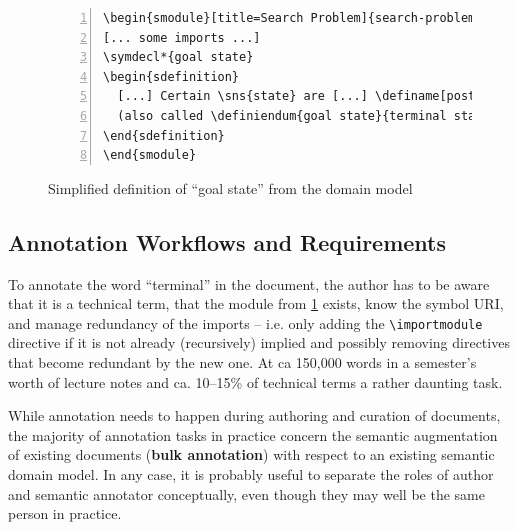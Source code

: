 \documentclass[runningheads]{llncs}
\begin{document}
\begin{figure}[ht]\centering
\begin{lstlisting}[morekeywords={definame,symdecl,definiendum},numbers=left,
escapechar=!]
\begin{smodule}[title=Search Problem]{search-problem}
[... some imports ...]
\symdecl*{goal state}
\begin{sdefinition}
  [...] Certain \sns{state} are [...] \definame[post=s]{goal state} [...]
  (also called \definiendum{goal state}{terminal states}).
\end{sdefinition}
\end{smodule}
\end{lstlisting}
  \caption{Simplified definition of ``goal state'' from the domain model}\label{fig:state-space}
\end{figure}

\subsection{Annotation Workflows and Requirements}\label{sec:workflows}

To annotate the word ``terminal'' in the document, the author has to be aware that it is a
technical term, that the module from \cref{fig:state-space} exists, know the symbol URI,
and manage redundancy of the imports -- i.e. only adding the \lstinline|\importmodule|
directive if it is not already (recursively) implied and possibly removing directives that
become redundant by the new one.  At ca 150,000 words in a semester's worth of lecture
notes and ca. 10--15\% of technical terms a rather daunting task.

While annotation needs to happen during authoring and curation of documents, the majority
of annotation tasks in practice concern the semantic augmentation of existing documents
(\textbf{bulk annotation}) with respect to an existing semantic domain model. In any case,
it is probably useful to separate the roles of author and semantic annotator conceptually,
even though they may well be the same person in practice.
\end{document}
